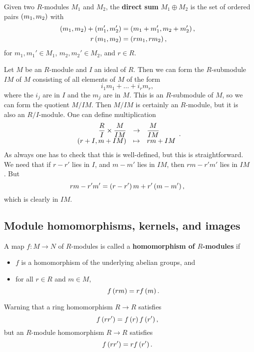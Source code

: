 \begin{definition}
Given two $ R $-modules $ M_1 $ and $ M_2 $, the \textbf{direct sum} $ M_1 \oplus M_2 $ is the set of ordered pairs $ \left( m_1, m_2 \right) $ with
\begin{align*}
\left( m_1, m_2 \right) + \left( m_1', m_2' \right) & = \left( m_1 + m_1', m_2 + m_2' \right), \\
r\left( m_1, m_2 \right) & = \left( rm_1, rm_2 \right),
\end{align*}
for $ m_1, m_1' \in M_1 $, $ m_2, m_2' \in M_2 $, and $ r \in R $.
\end{definition}

\begin{example*}
Let $ M $ be an $ R $-module and $ I $ an ideal of $ R $. Then we can form the $ R $-submodule $ IM $ of $ M $ consisting of all elements of $ M $ of the form
$$ i_1m_1 + \dots + i_rm_r, $$
where the $ i_j $ are in $ I $ and the $ m_j $ are in $ M $. This is an $ R $-submodule of $ M $, so we can form the quotient $ M / IM $. Then $ M / IM $ is certainly an $ R $-module, but it is also an $ R / I $-module. One can define multiplication
$$ \function{\dfrac{R}{I} \times \dfrac{M}{IM}}{\dfrac{M}{IM}}{\rb{r + I, m + IM}}{rm + IM}. $$
As always one has to check that this is well-defined, but this is straightforward. We need that if $ r - r' $ lies in $ I $, and $ m - m' $ lies in $ IM $, then $ rm - r'm' $ lies in $ IM $. But
$$ rm - r'm' = \left( r - r' \right)m + r'\left( m - m' \right), $$
which is clearly in $ IM $.
\end{example*}

\subsection{Module homomorphisms, kernels, and images}

\begin{definition}
A map $ f : M \to N $ of $ R $-modules is called a \textbf{homomorphism of $ R $-modules} if
\begin{itemize}
\item $ f $ is a homomorphism of the underlying abelian groups, and
\item for all $ r \in R $ and $ m \in M $,
$$ f\left( rm \right) = rf\left( m \right). $$
\end{itemize}
\end{definition}

Warning that a ring homomorphism $ R \to R $ satisfies
$$ f\left( rr' \right) = f\left( r \right)f\left( r' \right), $$
but an $ R $-module homomorphism $ R \to R $ satisfies
$$ f\left( rr' \right) = rf\left( r' \right). $$

